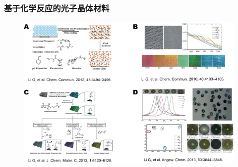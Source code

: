 \documentclass{beamer}
\begin{document}



\begin{frame}
  \frametitle{基于化学反应的光子晶体材料}
  \begin{figure}[t]
    \centering
    \includegraphics[width=0.88\linewidth]{figures/chem-react.png}
  \end{figure}
\end{frame}
\end{document}
